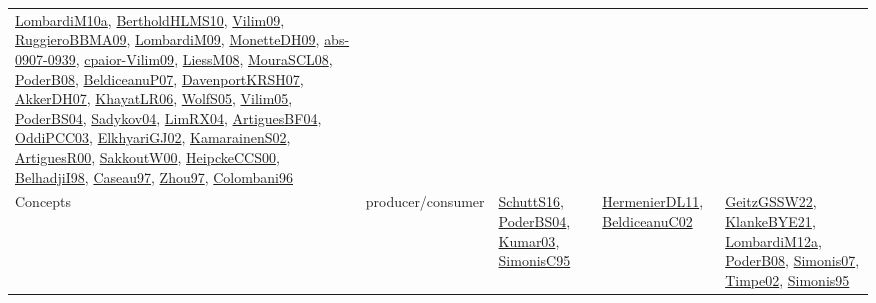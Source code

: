 {\begin{longtable}{lp{3cm}>{\raggedright}p{6cm}>{\raggedright}p{6cm}p{8cm}}
\href{articles/LombardiM10a.pdf}{LombardiM10a}\cite{LombardiM10a}, \href{papers/BertholdHLMS10.pdf}{BertholdHLMS10}\cite{BertholdHLMS10}, \href{papers/Vilim09.pdf}{Vilim09}\cite{Vilim09}, \href{articles/RuggieroBBMA09.pdf}{RuggieroBBMA09}\cite{RuggieroBBMA09}, \href{papers/LombardiM09.pdf}{LombardiM09}\cite{LombardiM09}, \href{papers/MonetteDH09.pdf}{MonetteDH09}\cite{MonetteDH09}, \href{articles/abs-0907-0939.pdf}{abs-0907-0939}\cite{abs-0907-0939}, \href{papers/cpaior-Vilim09.pdf}{cpaior-Vilim09}\cite{cpaior-Vilim09}, \href{articles/LiessM08.pdf}{LiessM08}\cite{LiessM08}, \href{papers/MouraSCL08.pdf}{MouraSCL08}\cite{MouraSCL08}, \href{papers/PoderB08.pdf}{PoderB08}\cite{PoderB08}, \href{papers/BeldiceanuP07.pdf}{BeldiceanuP07}\cite{BeldiceanuP07}, \href{papers/DavenportKRSH07.pdf}{DavenportKRSH07}\cite{DavenportKRSH07}, \href{papers/AkkerDH07.pdf}{AkkerDH07}\cite{AkkerDH07}, \href{articles/KhayatLR06.pdf}{KhayatLR06}\cite{KhayatLR06}, \href{papers/WolfS05.pdf}{WolfS05}\cite{WolfS05}, \href{papers/Vilim05.pdf}{Vilim05}\cite{Vilim05}, \href{articles/PoderBS04.pdf}{PoderBS04}\cite{PoderBS04}, \href{papers/Sadykov04.pdf}{Sadykov04}\cite{Sadykov04}, \href{papers/LimRX04.pdf}{LimRX04}\cite{LimRX04}, \href{papers/ArtiguesBF04.pdf}{ArtiguesBF04}\cite{ArtiguesBF04}, \href{papers/OddiPCC03.pdf}{OddiPCC03}\cite{OddiPCC03}, \href{papers/ElkhyariGJ02.pdf}{ElkhyariGJ02}\cite{ElkhyariGJ02}, \href{papers/KamarainenS02.pdf}{KamarainenS02}\cite{KamarainenS02}, \href{articles/ArtiguesR00.pdf}{ArtiguesR00}\cite{ArtiguesR00}, \href{articles/SakkoutW00.pdf}{SakkoutW00}\cite{SakkoutW00}, \href{articles/HeipckeCCS00.pdf}{HeipckeCCS00}\cite{HeipckeCCS00}, \href{articles/BelhadjiI98.pdf}{BelhadjiI98}\cite{BelhadjiI98}, \href{papers/Caseau97.pdf}{Caseau97}\cite{Caseau97}, \href{articles/Zhou97.pdf}{Zhou97}\cite{Zhou97}, \href{papers/Colombani96.pdf}{Colombani96}\cite{Colombani96}\\
Concepts & producer/consumer & \href{papers/SchuttS16.pdf}{SchuttS16}\cite{SchuttS16}, \href{articles/PoderBS04.pdf}{PoderBS04}\cite{PoderBS04}, \href{papers/Kumar03.pdf}{Kumar03}\cite{Kumar03}, \href{papers/SimonisC95.pdf}{SimonisC95}\cite{SimonisC95} & \href{papers/HermenierDL11.pdf}{HermenierDL11}\cite{HermenierDL11}, \href{papers/BeldiceanuC02.pdf}{BeldiceanuC02}\cite{BeldiceanuC02} & \href{papers/GeitzGSSW22.pdf}{GeitzGSSW22}\cite{GeitzGSSW22}, \href{papers/KlankeBYE21.pdf}{KlankeBYE21}\cite{KlankeBYE21}, \href{articles/LombardiM12a.pdf}{LombardiM12a}\cite{LombardiM12a}, \href{papers/PoderB08.pdf}{PoderB08}\cite{PoderB08}, \href{articles/Simonis07.pdf}{Simonis07}\cite{Simonis07}, \href{articles/Timpe02.pdf}{Timpe02}\cite{Timpe02}, \href{papers/Simonis95.pdf}{Simonis95}\cite{Simonis95}\\

\end{longtable}}
